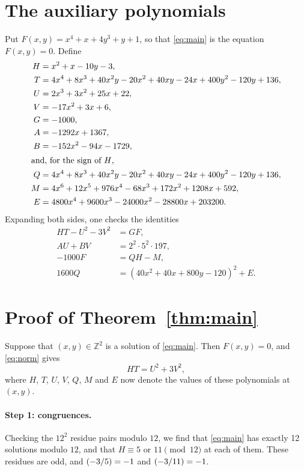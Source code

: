 \documentclass[11pt]{article}
\newcommand{\Z}{\mathbb{Z}}
\newcommand{\leg}[2]{\mathchoice{\biggl(\dfrac{#1}{#2}\biggr)}{(#1/#2)}{(#1/#2)}{(#1/#2)}}
\begin{document}
\section{The auxiliary polynomials}

Put $F(x,y)=x^{4}+x+4y^{3}+y+1$, so that \eqref{eq:main} is the equation $F(x,y)=0$. Define
\begin{align*}
H&=x^{2}+x-10y-3,\\
T&=4x^{4}+8x^{3}+40x^{2}y-20x^{2}+40xy-24x+400y^{2}-120y+136,\\
U&=2x^{3}+3x^{2}+25x+22,\\
V&=-17x^{2}+3x+6,\\
G&=-1000,\\
A&=-1292x+1367,\\
B&=-152x^{2}-94x-1729,\\
\intertext{and, for the sign of $H$,}
Q&=4x^{4}+8x^{3}+40x^{2}y-20x^{2}+40xy-24x+400y^{2}-120y+136,\\
M&=4x^{6}+12x^{5}+976x^{4}-68x^{3}+172x^{2}+1208x+592,\\
E&=4800x^{4}+9600x^{3}-24000x^{2}-28800x+203200.
\end{align*}
Expanding both sides, one checks the identities
\begin{align}
HT-U^2-3V^2&=GF,\label{eq:norm}\\
AU+BV&=2^{2}\cdot 5^{2}\cdot 197,\label{eq:bezout}\\
-1000F&=QH-M,\label{eq:sign}\\
1600Q&=(40x^{2}+40x+800y-120)^2+E.\label{eq:sign2}
\end{align}

\section{Proof of Theorem~\ref{thm:main}}

Suppose that $(x,y)\in\Z^2$ is a solution of \eqref{eq:main}. Then $F(x,y)=0$, and \eqref{eq:norm} gives
\begin{equation}\label{eq:HT}
HT=U^2+3V^2,
\end{equation}
where $H$, $T$, $U$, $V$, $Q$, $M$ and $E$ now denote the values of these polynomials at $(x,y)$.

\paragraph{Step 1: congruences.} Checking the $12^2$ residue pairs modulo $12$, we find that \eqref{eq:main} has exactly 12 solutions modulo $12$, and that $H\equiv5\text{ or }11\pmod{12}$ at each of them. These residues are odd, and $\leg{-3}{5}=-1$ and $\leg{-3}{11}=-1$.
\end{document}
